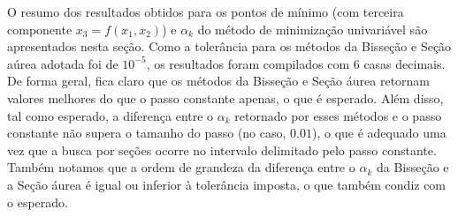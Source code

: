 \documentclass[10pt, a4paper]{article}
\begin{document}
O resumo dos resultados obtidos para os pontos de mínimo (com terceira componente $x_3 = f(x_1, x_2)$) e $\alpha_k$ do método de minimização
univariável são apresentados nesta seção. Como a tolerância para os métodos da Bisseção e Seção aúrea adotada foi de $10^{-5}$, os resultados
foram compilados com 6 casas decimais. De forma geral, fica claro que os métodos da Bisseção e Seção áurea retornam valores melhores do que o passo
constante apenas, o que é esperado. Além disso, tal como esperado, a diferença entre o $\alpha_k$ retornado por esses métodos e o passo constante 
não supera o tamanho do passo (no caso, $0.01$), o que é adequado uma vez que a busca por seções ocorre no intervalo delimitado pelo passo constante. 
Também notamos que a ordem de grandeza da diferença entre o $\alpha_k$ da Bisseção e a Seção áurea é igual ou inferior à tolerância imposta, o que 
também condiz com o esperado.
\end{document}
